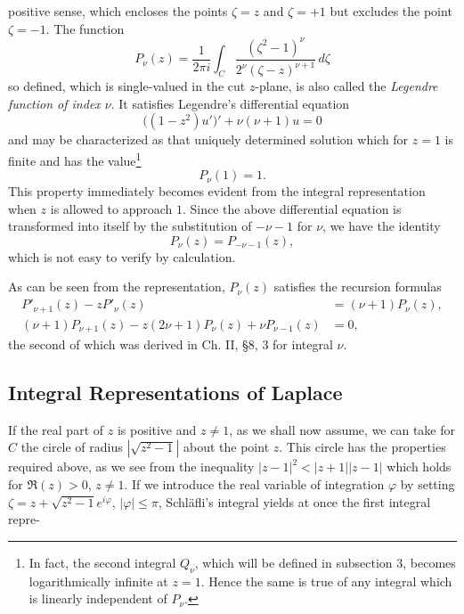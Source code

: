 positive sense, which encloses the points $\zeta=z$ and $\zeta=+1$ but excludes the point $\zeta=-1$. The function
\begin{equation}\tag{47}
P_\nu(z)=\frac1{2\pi i}\int_C\frac{(\zeta^2-1)^\nu}{2^\nu(\zeta-z)^{\nu+1}}\,d\zeta
\end{equation}
so defined, which is single-valued in the cut $z$-plane, is also called the \emph{Legendre function of index $\nu$}. It satisfies Legendre's differential equation
\begin{equation}\tag{48}
\bigl((1-z^2)u'\bigr)'+\nu(\nu+1)u=0
\end{equation}
and may be characterized as that uniquely determined solution which for $z=1$ is finite and has the value\footnote{In fact, the second integral $Q_\nu$, which will be defined in subsection 3, becomes logarithmically infinite at $z=1$. Hence the same is true of any integral which is linearly independent of $P_\nu$.}
\[
P_\nu(1)=1.
\]
This property immediately becomes evident from the integral representation when $z$ is allowed to approach $1$. Since the above differential equation is transformed into itself by the substitution of $-\nu-1$ for $\nu$, we have the identity
\[
P_\nu(z)=P_{-\nu-1}(z),
\]
which is not easy to verify by calculation.

As can be seen from the representation, $P_\nu(z)$ satisfies the recursion formulas
\begin{equation}\tag{49}
\begin{aligned}
P'_{\nu+1}(z)-zP'_\nu(z)&=(\nu+1)P_\nu(z),\\
(\nu+1)P_{\nu+1}(z)-z(2\nu+1)P_\nu(z)+\nu P_{\nu-1}(z)&=0,
\end{aligned}
\end{equation}
the second of which was derived in Ch. II, \S8, 3 for integral $\nu$.

\subsection{Integral Representations of Laplace}
If the real part of $z$ is positive and $z\ne1$, as we shall now assume, we can take for $C$ the circle of radius $|\sqrt{z^2-1}|$ about the point $z$. This circle has the properties required above, as we see from the inequality $|z-1|^2<|z+1||z-1|$ which holds for $\Re(z)>0$, $z\ne1$. If we introduce the real variable of integration $\varphi$ by setting $\zeta=z+\sqrt{z^2-1}e^{i\varphi}$, $|\varphi|\le\pi$, Schl\"afli's integral yields at once the first integral repre-

